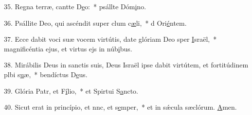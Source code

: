 35. Regna terræ, cantte D\uline{e}o:~* psállte Dóm\uline{i}no.\par 
36. Psállite Deo, qui ascéndit super clum c\uline{æ}li,~* d Ori\uline{é}ntem.\par 
37. Ecce dabit voci suæ vocem virtútis, date glóriam Deo sper \uline{I}sraël,~* magnificéntia ejus, et virtus ejs in núb\uline{i}bus.\par 
38. Mirábilis Deus in sanctis suis, Deus Israël ipse dabit virtútem, et fortitúdinem plbi s\uline{u}æ,~* bendíctus D\uline{e}us.\par 
39. Glória Patr, et F\uline{í}lio,~* et Spirtui S\uline{a}ncto.\par 
40. Sicut erat in princípio, et nnc, et s\uline{e}mper,~* et in sǽcula sæclórum. \uline{A}men.\par 
